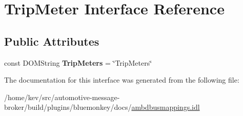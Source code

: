 \hypertarget{interfaceTripMeter}{\section{Trip\+Meter Interface Reference}
\label{interfaceTripMeter}
}
\subsection*{Public Attributes}
\begin{DoxyCompactItemize}
\item 
\hypertarget{interfaceTripMeter_a0f8ccb9b8abcc132dc98b1d14ad681a3}{const D\+O\+M\+String {\bfseries Trip\+Meters} = \char`\"{}Trip\+Meters\char`\"{}}\label{interfaceTripMeter_a0f8ccb9b8abcc132dc98b1d14ad681a3}

\end{DoxyCompactItemize}


The documentation for this interface was generated from the following file\+:\begin{DoxyCompactItemize}
\item 
/home/kev/src/automotive-\/message-\/broker/build/plugins/bluemonkey/docs/\hyperlink{ambdbusmappings_8idl}{ambdbusmappings.\+idl}\end{DoxyCompactItemize}
